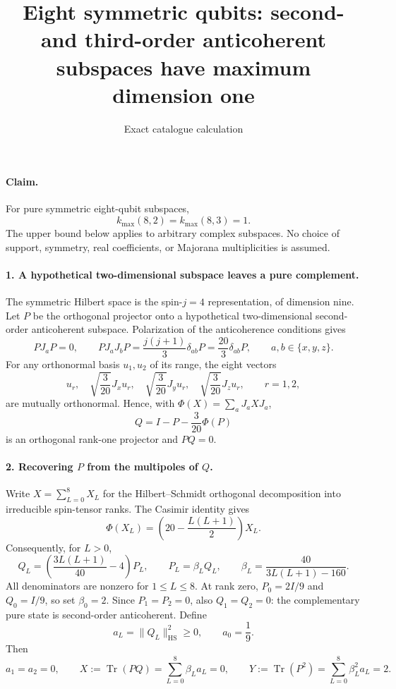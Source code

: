 \documentclass[11pt]{article}
\newcommand{\Tr}{\operatorname{Tr}}
\newcommand{\HS}{\mathrm{HS}}
\begin{document}
\title{Eight symmetric qubits: second- and third-order anticoherent subspaces have maximum dimension one}
\author{Exact catalogue calculation}
\date{}
\maketitle

\paragraph{Claim.}
For pure symmetric eight-qubit subspaces,
\[
 k_{\max}(8,2)=k_{\max}(8,3)=1.
\]
The upper bound below applies to arbitrary complex subspaces. No choice of support, symmetry, real coefficients, or Majorana multiplicities is assumed.

\paragraph{1. A hypothetical two-dimensional subspace leaves a pure complement.}
The symmetric Hilbert space is the spin-$j=4$ representation, of dimension nine. Let $P$ be the orthogonal projector onto a hypothetical two-dimensional second-order anticoherent subspace. Polarization of the anticoherence conditions gives
\[
 PJ_aP=0,\qquad PJ_aJ_bP=\frac{j(j+1)}3\delta_{ab}P
 =\frac{20}{3}\delta_{ab}P,
 \qquad a,b\in\{x,y,z\}.
\]
For any orthonormal basis $u_1,u_2$ of its range, the eight vectors
\[
 u_r,\quad \sqrt{\frac3{20}}J_xu_r,\quad
 \sqrt{\frac3{20}}J_yu_r,\quad
 \sqrt{\frac3{20}}J_zu_r,\qquad r=1,2,
\]
are mutually orthonormal. Hence, with $\Phi(X)=\sum_aJ_aXJ_a$,
\[
 Q=I-P-\frac3{20}\Phi(P)
\]
is an orthogonal rank-one projector and $PQ=0$.

\paragraph{2. Recovering $P$ from the multipoles of $Q$.}
Write $X=\sum_{L=0}^8 X_L$ for the Hilbert--Schmidt orthogonal decomposition into irreducible spin-tensor ranks. The Casimir identity gives
\[
 \Phi(X_L)=\left(20-\frac{L(L+1)}2\right)X_L.
\]
Consequently, for $L>0$,
\[
 Q_L=\left(\frac{3L(L+1)}{40}-4\right)P_L,
 \qquad P_L=\beta_L Q_L,
 \qquad \beta_L=\frac{40}{3L(L+1)-160}.
\]
All denominators are nonzero for $1\le L\le8$. At rank zero,
$P_0=2I/9$ and $Q_0=I/9$, so set $\beta_0=2$.
Since $P_1=P_2=0$, also $Q_1=Q_2=0$: the complementary pure state is second-order anticoherent.
Define
\[
 a_L=\|Q_L\|_{\HS}^2\ge0,\qquad a_0=\frac19.
\]
Then
\[
 a_1=a_2=0,\qquad
 X:=\Tr(PQ)=\sum_{L=0}^8\beta_La_L=0,\qquad
 Y:=\Tr(P^2)=\sum_{L=0}^8\beta_L^2a_L=2.
\]
\end{document}
